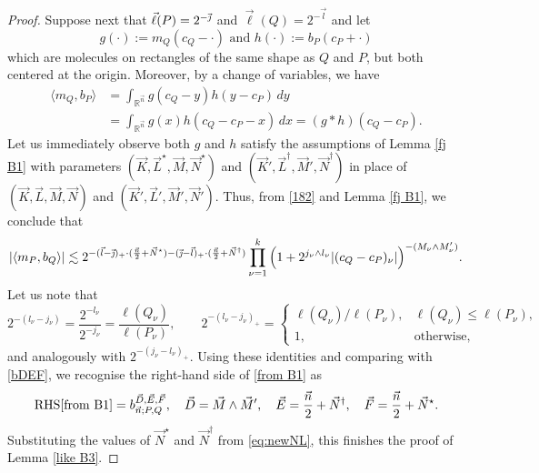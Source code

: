 \documentclass[11pt, reqno]{amsart}
\theoremstyle{definition}
\theoremstyle{remark}
\numberwithin{equation}{section}
\newcommand{\vD}{\vec D}
\newcommand{\vE}{\vec E}
\newcommand{\vF}{\vec F}
\newcommand{\vj}{\vec{\textit{\j}}}
\newcommand{\vn}{\vec n}
\newcommand{\vl}{\vec l}
\begin{document}
\begin{proof}
Suppose next that $\vec\ell(P)=2^{-\vj}$ and $\vec\ell(Q)=2^{-\vec l}$ and let
\begin{equation*}
g(\cdot):=m_Q(c_Q-\cdot)
\text{ and }
h(\cdot):=b_P(c_P+\cdot)
\end{equation*}
which are molecules on rectangles of the same shape as $Q$ and $P$,
but both centered at the origin. Moreover, by a change of variables, we have
\begin{equation}\label{182}
\begin{split}
\langle m_Q,b_P\rangle
&=\int_{\mathbb R^{\vn}}g(c_Q-y)h(y-c_P)\,dy\\
&=\int_{\mathbb R^{\vn}}g(x)h(c_Q-c_P-x)\,dx
=(g*h)(c_Q-c_P).
\end{split}
\end{equation}
Let us immediately observe both $g$ and $h$ satisfy
the assumptions of Lemma \ref{fj B1} with parameters $(\vec K,\vec L^\star,\vec M,\vec N^\star)$ and $(\vec K',\vec L^\dagger,\vec M',\vec N^\dagger)$ in place of $(\vec K,\vec L,\vec M,\vec N)$ and $(\vec K',\vec L',\vec M',\vec N')$.
Thus, from \eqref{182} and Lemma \ref{fj B1}, we conclude that
\begin{align}\label{from B1}
|\langle m_P,b_Q\rangle|
\lesssim
2^{-(\vl-\vj)_+\cdot(\frac{\vn}{2}+\vec N^\star)-(\vj-\vl)_+\cdot(\frac{\vn}{2}+\vec N^{\dagger})}
\prod_{\nu=1}^{k}
\Big(1+2^{j_\nu \wedge l_\nu}|(c_Q-c_P)_\nu|\Big)^{-(M_\nu\wedge M_\nu')}.
\end{align}
Let us note that
\begin{equation*}
  2^{-(l_\nu-j_\nu)}=\frac{2^{-l_\nu}}{2^{-j_\nu}}=\frac{\ell(Q_\nu)}{\ell(P_\nu)},\qquad
  2^{-(l_\nu-j_\nu)_+}=\begin{cases} \ell(Q_\nu)/\ell(P_\nu), & \ell(Q_\nu)\leq\ell(P_\nu), \\ 1, & \text{otherwise},\end{cases}
\end{equation*}
and analogously with $2^{-(j_\nu-l_\nu)_+}$. Using these identities and comparing with \eqref{bDEF}, we recognise the right-hand side of \eqref{from B1} as
\begin{equation*}
  \mathrm{RHS}\eqref{from B1}=b_{\vn;P,Q}^{\vD,\vE,\vF},\quad
  \vD=\vec M\wedge\vec M',\quad
  \vE=\frac{\vn}{2}+\vec N^{\dagger},\quad
  \vF=\frac{\vn}{2}+\vec N^\star.
\end{equation*}
Substituting the values of $\vec N^\star$ and $\vec N^{\dagger}$ from \eqref{eq:newNL}, this finishes the proof of Lemma \ref{like B3}.
\end{proof}
\end{document}
